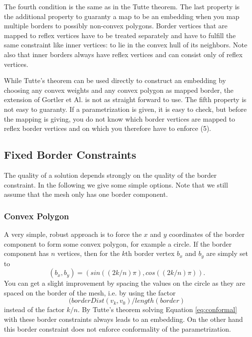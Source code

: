 The fourth condition is the same as in the Tutte theorem. The last property is the additional property to guaranty a map to be an embedding when you map multiple borders to possibly non-convex polygons. Border vertices that are mapped to reflex vertices have to be treated separately and have to fulfill the same constraint like inner vertices: to lie in the convex hull of its neighbors. Note also that inner borders always have reflex vertices and can consist only of reflex vertices.

While Tutte's theorem can be used directly to construct an embedding by choosing any convex weights and any convex polygon as mapped border, the extension of Gortler et Al. is not as straight forward to use. The fifth property is not easy to guaranty. If a parametrization is given, it is easy to check, but before the mapping is giving, you do not know which border vertices are mapped to reflex border vertices and on which you therefore have to enforce (5). 

\subsection{Fixed Border Constraints}
The quality of a solution depends strongly on the quality of the border constraint. In the following we give some simple options. Note that we still assume that the mesh only has one border component.

\subsubsection*{Convex Polygon}
A very simple, robust approach is to force the $x$ and $y$ coordinates of the border component to form some convex polygon, for example a circle. If the border component has $n$ vertices, then for the $k$th border vertex $b_x$ and $b_y$ are simply set to
\[(b_x,b_y) = (sin((2k/n)\pi),cos((2k/n)\pi)).\] 
You can get a slight improvement by spacing the values on the circle as they are spaced on the border of the mesh, i.e. by using the factor 
\[(borderDist(v_k,v_0)/length(border)\] 
instead of the factor $k/n$. By Tutte's theorem solving Equation \ref{eq:conformal} with these border constraints always leads to an embedding. On the other hand this border constraint does not enforce conformality of the parametrization.

